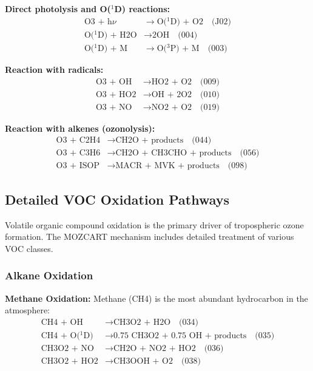 \documentclass[12pt,a4paper]{article}
\begin{document}
\textbf{Direct photolysis and O($^1$D) reactions:}
\begin{align}
\text{O3 + h$\nu$} &\rightarrow \text{O($^1$D) + O2} \quad \text{(J02)} \\
\text{O($^1$D) + H2O} &\rightarrow \text{2OH} \quad \text{(004)} \\
\text{O($^1$D) + M} &\rightarrow \text{O($^3$P) + M} \quad \text{(003)}
\end{align}

\textbf{Reaction with radicals:}
\begin{align}
\text{O3 + OH} &\rightarrow \text{HO2 + O2} \quad \text{(009)} \\
\text{O3 + HO2} &\rightarrow \text{OH + 2O2} \quad \text{(010)} \\
\text{O3 + NO} &\rightarrow \text{NO2 + O2} \quad \text{(019)}
\end{align}

\textbf{Reaction with alkenes (ozonolysis):}
\begin{align}
\text{O3 + C2H4} &\rightarrow \text{CH2O + products} \quad \text{(044)} \\
\text{O3 + C3H6} &\rightarrow \text{CH2O + CH3CHO + products} \quad \text{(056)} \\
\text{O3 + ISOP} &\rightarrow \text{MACR + MVK + products} \quad \text{(098)}
\end{align}

\subsection{Detailed VOC Oxidation Pathways}

Volatile organic compound oxidation is the primary driver of tropospheric ozone formation. The MOZCART mechanism includes detailed treatment of various VOC classes.

\subsubsection{Alkane Oxidation}

\textbf{Methane Oxidation:}
Methane (CH4) is the most abundant hydrocarbon in the atmosphere:
\begin{align}
\text{CH4 + OH} &\rightarrow \text{CH3O2 + H2O} \quad \text{(034)} \\
\text{CH4 + O($^1$D)} &\rightarrow \text{0.75 CH3O2 + 0.75 OH + products} \quad \text{(035)} \\
\text{CH3O2 + NO} &\rightarrow \text{CH2O + NO2 + HO2} \quad \text{(036)} \\
\text{CH3O2 + HO2} &\rightarrow \text{CH3OOH + O2} \quad \text{(038)}
\end{align}
\end{document}
